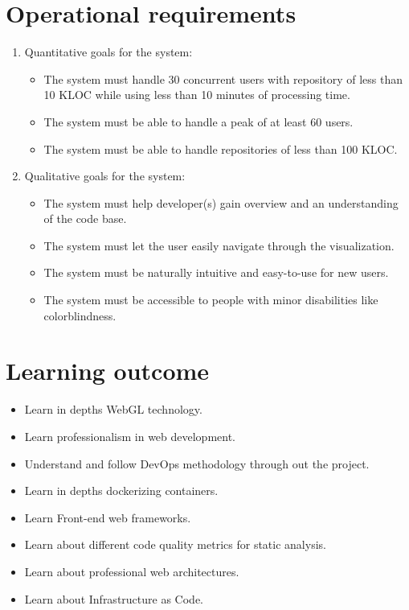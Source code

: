 \section{Operational requirements}
    \begin{enumerate}  
        \item Quantitative goals for the system: 
        \begin{itemize}
            \item The system must handle 30 concurrent users with repository of less than 10 KLOC while using less than 10 minutes of processing time.
            \item The system must be able to handle a peak of at least 60 users.
            \item The system must be able to handle repositories of less than 100 KLOC. 
        \end{itemize}
        \item Qualitative goals for the system:
        \begin{itemize}
            \item The system must help developer(s) gain overview and an understanding of the code base.
            \item The system must let the user easily navigate through the visualization.
            \item The system must be naturally intuitive and easy-to-use for new users.
            \item The system must be accessible to people with minor disabilities like colorblindness. 
        \end{itemize}
    \end{enumerate}
        
\section{Learning outcome}
    \begin{itemize}
        \item Learn in depths WebGL technology.
        \item Learn professionalism in web development.
        \item Understand and follow DevOps methodology through out the project.
        \item Learn in depths dockerizing containers.
        \item Learn Front-end web frameworks.
        \item Learn about different code quality metrics for static analysis.
        \item Learn about professional web architectures.
        \item Learn about Infrastructure as Code.
    \end{itemize}

